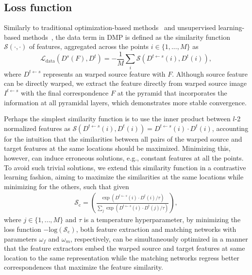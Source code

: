 \documentclass[10pt,twocolumn,letterpaper]{article}
\begin{document}
\subsection{Loss function}\label{sec:3_3}
Similarly to traditional optimization-based methods~\cite{liu2010sift,kim2017dctm} and unsupervised learning-based methods~\cite{rocco2018end,kim2019semantic}, the data term in DMP is defined as the similarity function $\mathcal{S}(\cdot,\cdot)$ of features, aggregated across the points $i \in \{1,...,M\}$ as
\begin{equation}\label{eq6}
\mathcal{L}_\mathrm{data}(D^{s}(F),{D}^{t}) = -\frac{1}{M}\sum_{i} \mathcal{S}(D^{t\leftarrow s}(i),{D}^{t}(i)),
\end{equation}
where $D^{t\leftarrow s}$ represents an warped source feature with $F$. Although source feature can be directly warped, we extract the feature directly from warped source image $I^{t\leftarrow s}$ with the final correspondence $F$ at the pyramid that incorporates the information at all pyramidal layers, which demonstrates more stable convergence.

Perhaps the simplest similarity function is to use the inner product between $l$-2 normalized features as $\mathcal{S}(D^{t\leftarrow s}(i),{D}^{t}(i)) = D^{t\leftarrow s}(i)\cdot{D}^{t}(i)$,
accounting for the intuition that the similarities between all pairs of the warped source and target features at the same locations should be maximized. Minimizing this, however, can induce erroneous solutions, e.g., constant features at all the points. To avoid such trivial solutions, we extend this similarity function in a contrastive learning fashion, aiming to maximize the similarities at the same locations while minimizing for the others, such that given
\begin{equation}
\begin{split}
\mathcal{S}_\mathrm{c}=
\left(\frac{ \exp(D^{t\leftarrow s}(i)\cdot{D}^{t}(i) / \tau) }
{  \sum_j \exp(D^{t\leftarrow s}(i)\cdot{D}^{t}(j) / \tau) } \right),
\end{split}
\end{equation}
where $j\in \{1,...,M\}$ and $\tau$ is a temperature hyperparameter, 
by minimizing the loss function $-\mathrm{log}(\mathcal{S}_\mathrm{c})$, both feature extraction and matching networks with parameters $\omega_f$ and $\omega_m$, respectively, can be simultaneously optimized in a manner that the feature extractors embed the warped source and target features at same location to the same representation while the matching networks regress better correspondences that maximize the feature similarity. 
\end{document}

